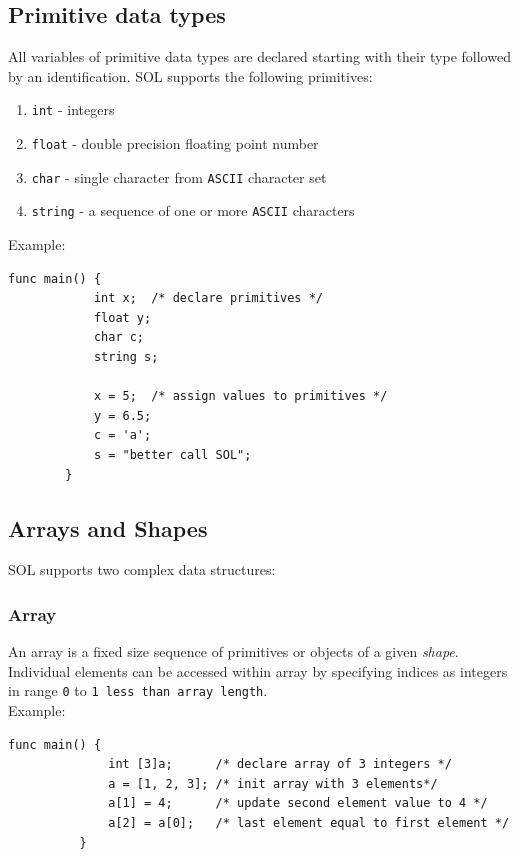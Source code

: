 \documentclass[letterpaper,12pt]{report}
\begin{document}
    \subsection{Primitive data types}
      All variables of primitive data types are declared starting with their type followed by an identification. SOL supports the following primitives:
      \begin{enumerate}
        \itemsep 0em
        \item \texttt{int} - integers
        \item \texttt{float} - double precision floating point number
        \item \texttt{char} - single character from \texttt{ASCII} character set
        \item \texttt{string} - a sequence of one or more \texttt{ASCII} characters
      \end{enumerate}
      Example:\\
      \begin{lstlisting}[style=sol]
        func main() {
            int x;  /* declare primitives */
            float y;
            char c;
            string s;

            x = 5;  /* assign values to primitives */
            y = 6.5;
            c = 'a';
            s = "better call SOL";
        }
      \end{lstlisting}

    \subsection{Arrays and Shapes}
      SOL supports two complex data structures:
      \subsubsection{Array}
        An array is a fixed size sequence of primitives or objects of a given \textit{shape}. Individual elements can be accessed within array by specifying indices as integers in range \texttt{0} to \texttt{1 less than array length}.\\
        Example:\\
        \begin{lstlisting}[style=sol]
          func main() {
              int [3]a;      /* declare array of 3 integers */
              a = [1, 2, 3]; /* init array with 3 elements*/
              a[1] = 4;      /* update second element value to 4 */
              a[2] = a[0];   /* last element equal to first element */
          }
        \end{lstlisting}
\end{document}
